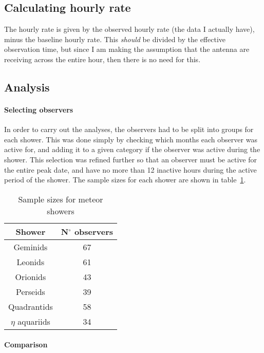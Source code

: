 \subsection{Calculating hourly rate}

The hourly rate is given by the observed hourly rate (the data I actually
have), minus the baseline hourly rate. This \textit{should} be divided by the
effective observation time, but since I am making the assumption that the
antenna are receiving across the entire hour, then there is no need for this.

\subsection{Analysis}

\paragraph{Selecting observers}

In order to carry out the analyses, the observers had to be split into groups
for each shower. This was done simply by checking which months each observer
was active for, and adding it to a given category if the observer was active
during the shower. This selection was refined further so that an observer must
be active for the entire peak date, and have no more than 12 inactive hours
during the active period of the shower. The sample sizes for each shower are
shown in table~\ref{tab:zhr:sizes}.

\begin{table} 
	\centering 
	\begin{tabular}{cc} 
		\hline 
		Shower & N$^{\circ}$ observers \\ \hline 
		Geminids & 67 \\ 
		Leonids & 61 \\ 
		Orionids & 43 \\ 
		Perseids & 39 \\ 
		Quadrantids & 58 \\ 
		$\eta$ aquariids & 34 \\ \hline 
	\end{tabular} 
	\caption{Sample sizes for meteor showers \label{tab:zhr:sizes}}
\end{table}

\paragraph{Comparison\\}

